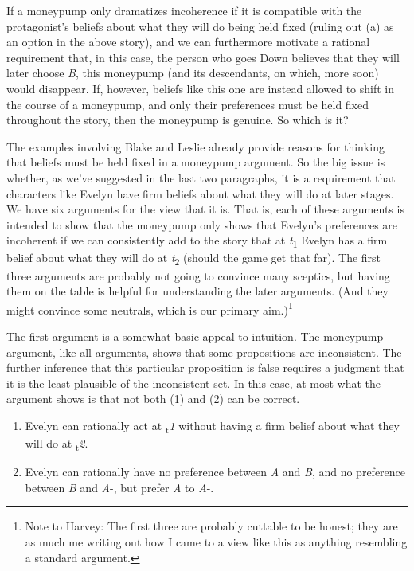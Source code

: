 \documentclass[
  11pt,
  letterpaper,
  DIV=11,
  numbers=noendperiod,
  twoside]{scrartcl}
\providecommand{\tightlist}{%
  \setlength{\itemsep}{0pt}\setlength{\parskip}{0pt}}\usepackage{longtable,booktabs,array}
\begin{document}
If a moneypump only dramatizes incoherence if it is compatible with the
protagonist's beliefs about what they will do being held fixed (ruling
out (a) as an option in the above story), and we can furthermore
motivate a rational requirement that, in this case, the person who goes
Down believes that they will later choose \emph{B}, this moneypump (and
its descendants, on which, more soon) would disappear. If, however,
beliefs like this one are instead allowed to shift in the course of a
moneypump, and only their preferences must be held fixed throughout the
story, then the moneypump is genuine. So which is it?

The examples involving Blake and Leslie already provide reasons for
thinking that beliefs must be held fixed in a moneypump argument. So the
big issue is whether, as we've suggested in the last two paragraphs, it
is a requirement that characters like Evelyn have firm beliefs about
what they will do at later stages. We have six arguments for the view
that it is. That is, each of these arguments is intended to show that
the moneypump only shows that Evelyn's preferences are incoherent if we
can consistently add to the story that at \emph{t}\textsubscript{1}
Evelyn has a firm belief about what they will do at
\emph{t}\textsubscript{2} (should the game get that far). The first
three arguments are probably not going to convince many sceptics, but
having them on the table is helpful for understanding the later
arguments. (And they might convince some neutrals, which is our primary
aim.)\footnote{Note to Harvey: The first three are probably cuttable to
  be honest; they are as much me writing out how I came to a view like
  this as anything resembling a standard argument.}

The first argument is a somewhat basic appeal to intuition. The
moneypump argument, like all arguments, shows that some propositions are
inconsistent. The further inference that this particular proposition is
false requires a judgment that it is the least plausible of the
inconsistent set. In this case, at most what the argument shows is that
not both (1) and (2) can be correct.

\begin{enumerate}
\def\labelenumi{\arabic{enumi}.}
\tightlist
\item
  Evelyn can rationally act at \textsubscript{t}\emph{1} without having
  a firm belief about what they will do at \textsubscript{t}\emph{2}.
\item
  Evelyn can rationally have no preference between \emph{A} and
  \emph{B}, and no preference between \emph{B} and \emph{A}-, but prefer
  \emph{A} to \emph{A}-.
\end{enumerate}
\end{document}
